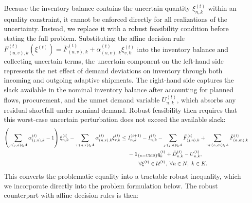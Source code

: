 \documentclass{article}
\begin{document}
Because the inventory balance contains the uncertain quantity $\xi_{n,k}^{(t)}$ within an equality constraint, it cannot be enforced directly for all realizations of the uncertainty. Instead, we replace it
with a robust feasibility condition before stating the full problem. Substituting the affine decision rule
$F_{(u,v),k}^{(t)}(\xi^{(t)}) = \bar F_{(u,v),k}^{(t)} + \alpha_{(u,v),k}^{(t)}\xi_{v,k}^{(t)}$ into the inventory balance and collecting uncertain terms, the uncertain component on the left-hand side represents the net effect of demand deviations on inventory through both incoming and outgoing adaptive shipments. The right-hand side captures the slack available in the nominal inventory balance after accounting for planned flows, procurement, and the unmet demand variable $U_{n,k}^{(t)}$, which absorbs any residual shortfall under nominal demand. Robust feasibility then requires that this worst-case uncertain perturbation does not exceed the available slack:
\begin{align}
\left(
\sum_{j:(j,n)\in A} \alpha_{(j,n),k}^{(t)} - 1
\right)\xi_{n,k}^{(t)}
-
\sum_{r:(n,r)\in A} \alpha_{(n,r),k}^{(t)} \xi_{r,k}^{(t)}
\le\;&
I_{n,k}^{(t+1)}
-
I_{n,k}^{(t)}
-
\sum_{j:(j,n)\in A} \bar F_{(j,n),k}^{(t)}
+
\sum_{m:(n,m)\in A} \bar F_{(n,m),k}^{(t)}
\notag\\
&-
\mathbf{1}_{\{n=\mathrm{CMS}\}} q_k^{(t)}
+
\bar D_{n,k}^{(t)}
-
U_{n,k}^{(t)},
\notag\\
&\qquad \forall \xi^{(t)}\in\mathcal{U}^{(t)},\ \forall n \in N,\ k \in K.
\label{eq:robust_inventory}
\end{align}
This converts the problematic equality into a tractable robust inequality, which we incorporate directly into the problem formulation below. The robust counterpart with affine decision rules is then:
\end{document}
